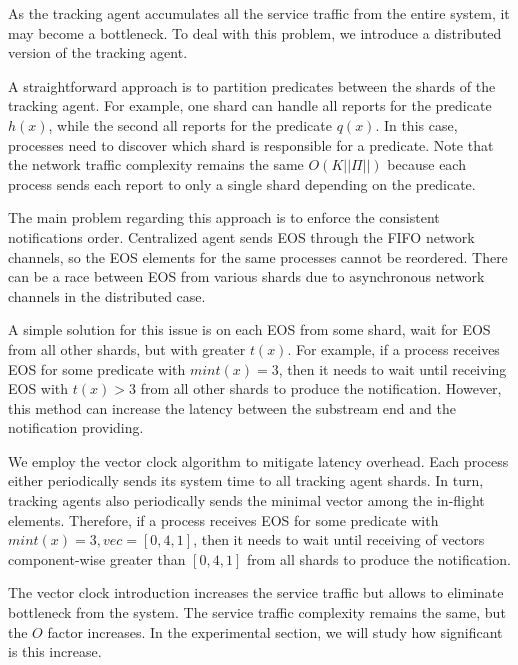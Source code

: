 As the tracking agent accumulates all the service traffic from the entire system, it may become a bottleneck. To deal with this problem, we introduce a distributed version of the tracking agent.

A straightforward approach is to partition predicates between the shards of the tracking agent. For example, one shard can handle all reports for the predicate $h(x)$, while the second all reports for the predicate $q(x)$. In this case, processes need to discover which shard is responsible for a predicate. Note that the network traffic complexity remains the same $O(K||\Pi||)$ because each process sends each report to only a single shard depending on the predicate.

The main problem regarding this approach is to enforce the consistent notifications order. Centralized agent sends EOS through the FIFO network channels, so the EOS elements for the same processes cannot be reordered. There can be a race between EOS from various shards due to asynchronous network channels in the distributed case.

A simple solution for this issue is on each EOS from some shard, wait for EOS from all other shards, but with greater $t(x)$. For example, if a process receives EOS for some predicate with $min t(x) = 3$, then it needs to wait until receiving EOS with $t(x) > 3$ from all other shards to produce the notification. However, this method can increase the latency between the substream end and the notification providing.

We employ the vector clock algorithm to mitigate latency overhead. Each process either periodically sends its system time to all tracking agent shards. In turn, tracking agents also periodically sends the minimal vector among the in-flight elements. Therefore, if a process receives EOS for some predicate with $min t(x) = 3, vec=[0,4,1]$, then it needs to wait until receiving of vectors component-wise greater than $[0,4,1]$ from all shards to produce the notification.

The vector clock introduction increases the service traffic but allows to eliminate bottleneck from the system. The service traffic complexity remains the same, but the $O$ factor increases. In the experimental section, we will study how significant is this increase.


